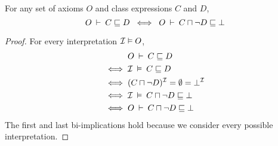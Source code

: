 \documentclass[paper.tex]{subfiles}
\begin{document}
\begin{lemma}
  \label{lem:subclassEntailsUnsat}
  For any set of axioms $O$ and class expressions $C$ and $D$,
  \[ O \:\vdash\: C \sqsubseteq D \;\iff\; O \:\vdash\: C \sqcap \neg D \sqsubseteq \bot \]
\end{lemma}
\begin{proof}
  For every interpretation $\mathcal{I} \vDash O$,
  \begin{align*}
    & O \:\vdash\: C \sqsubseteq D \\
    \iff{}& \mathcal{I} \:\vDash\: C \sqsubseteq D \\
    \iff{}& (C \sqcap \neg D)^{\mathcal{I}} = \emptyset = \bot^{\mathcal{I}} \\
    \iff{}& \mathcal{I} \:\vDash\: C \sqcap \neg D \sqsubseteq \bot \\
    \iff{}& O \:\vdash\: C \sqcap \neg D \sqsubseteq \bot
  \end{align*}
  The first and last bi-implications hold because we consider every possible interpretation.
\end{proof}
\end{document}
